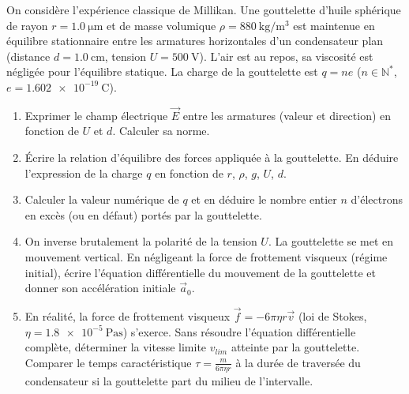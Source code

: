 \documentclass[11pt]{article}
\begin{document}
\begin{exercice}
On considère l'expérience classique de Millikan. Une gouttelette d'huile sphérique de rayon $r = \SI{1.0}{\micro\meter}$ et de masse volumique $\rho = \SI{880}{\kilogram\per\cubic\meter}$ est maintenue en équilibre stationnaire entre les armatures horizontales d'un condensateur plan (distance $d = \SI{1.0}{\centi\meter}$, tension $U = \SI{500}{\volt}$). L'air est au repos, sa viscosité est négligée pour l'équilibre statique. La charge de la gouttelette est $q = n e$ ($n \in \mathbb{N}^*$, $e = \SI{1.602e-19}{\coulomb}$).
\begin{enumerate}
    \item Exprimer le champ électrique $\vec{E}$ entre les armatures (valeur et direction) en fonction de $U$ et $d$. Calculer sa norme.
    \item Écrire la relation d'équilibre des forces appliquée à la gouttelette. En déduire l'expression de la charge $q$ en fonction de $r$, $\rho$, $g$, $U$, $d$.
    \item Calculer la valeur numérique de $q$ et en déduire le nombre entier $n$ d'électrons en excès (ou en défaut) portés par la gouttelette.
    \item On inverse brutalement la polarité de la tension $U$. La gouttelette se met en mouvement vertical. En négligeant la force de frottement visqueux (régime initial), écrire l'équation différentielle du mouvement de la gouttelette et donner son accélération initiale $\vec{a}_0$.
    \item En réalité, la force de frottement visqueux $\vec{f} = -6\pi\eta r \vec{v}$ (loi de Stokes, $\eta = \SI{1.8e-5}{\pascal\second}$) s'exerce. Sans résoudre l'équation différentielle complète, déterminer la vitesse limite $v_{lim}$ atteinte par la gouttelette. Comparer le temps caractéristique $\tau = \frac{m}{6\pi\eta r}$ à la durée de traversée du condensateur si la gouttelette part du milieu de l'intervalle.
\end{enumerate}
\end{exercice}
\end{document}
